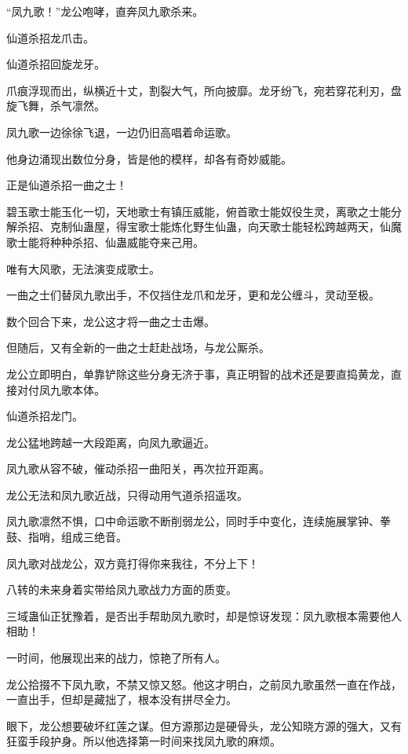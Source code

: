 
\begin{this_body}



“凤九歌！”龙公咆哮，直奔凤九歌杀来。

仙道杀招龙爪击。

仙道杀招回旋龙牙。

爪痕浮现而出，纵横近十丈，割裂大气，所向披靡。龙牙纷飞，宛若穿花利刃，盘旋飞舞，杀气凛然。

凤九歌一边徐徐飞退，一边仍旧高唱着命运歌。

他身边涌现出数位分身，皆是他的模样，却各有奇妙威能。

正是仙道杀招一曲之士！

碧玉歌士能玉化一切，天地歌士有镇压威能，俯首歌士能奴役生灵，离歌之士能分解杀招、克制仙蛊屋，得宝歌士能炼化野生仙蛊，向天歌士能轻松跨越两天，仙魔歌士能将种种杀招、仙蛊威能夺来己用。

唯有大风歌，无法演变成歌士。

一曲之士们替凤九歌出手，不仅挡住龙爪和龙牙，更和龙公缠斗，灵动至极。

数个回合下来，龙公这才将一曲之士击爆。

但随后，又有全新的一曲之士赶赴战场，与龙公厮杀。

龙公立即明白，单靠铲除这些分身无济于事，真正明智的战术还是要直捣黄龙，直接对付凤九歌本体。

仙道杀招龙门。

龙公猛地跨越一大段距离，向凤九歌逼近。

凤九歌从容不破，催动杀招一曲阳关，再次拉开距离。

龙公无法和凤九歌近战，只得动用气道杀招遥攻。

凤九歌凛然不惧，口中命运歌不断削弱龙公，同时手中变化，连续施展掌钟、拳鼓、指哨，组成三绝音。

凤九歌对战龙公，双方竟打得你来我往，不分上下！

八转的未来身着实带给凤九歌战力方面的质变。

三域蛊仙正犹豫着，是否出手帮助凤九歌时，却是惊讶发现：凤九歌根本需要他人相助！

一时间，他展现出来的战力，惊艳了所有人。

龙公拾掇不下凤九歌，不禁又惊又怒。他这才明白，之前凤九歌虽然一直在作战，一直出手，但却是藏拙了，根本没有拼尽全力。

眼下，龙公想要破坏红莲之谋。但方源那边是硬骨头，龙公知晓方源的强大，又有狂蛮手段护身。所以他选择第一时间来找凤九歌的麻烦。


\end{this_body}
